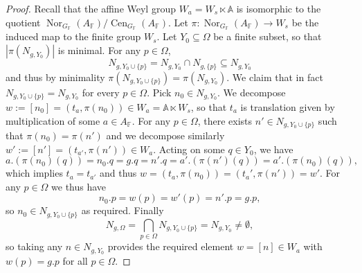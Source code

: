 \documentclass[10pt,a4paper]{amsart}
\newcommand{\A}{\mathbb{A}}
\newcommand{\F}{\mathbb{F} }
\begin{document}
\begin{proof}
			Recall that the affine Weyl group $W_a = W_s \ltimes \A$ is isomorphic to the quotient $\operatorname{Nor}_{G_\F}(A_\F) / \operatorname{Cen}_{G_\F}(A_\F)$. Let $\pi \colon \operatorname{Nor}_{G_\F}(A_\F) \to W_s$ be the induced map to the finite group $W_s$. Let $Y_0 \subseteq \Omega$ be a finite subset, so that $|\pi(N_{g,Y_0})|$ is minimal. For any $p \in \Omega$,
			$$
			N_{g,Y_0 \cup \{p\}} = N_{g,Y_0} \cap N_{g,\{p\}} \subseteq N_{g,Y_0}
			$$
			and thus by minimality $\pi(N_{g,Y_0 \cup \{p\}}) = \pi(N_{g,Y_0})$. We claim that in fact $N_{g,Y_0 \cup \{p\}} = N_{g,Y_0}$ for every $p \in \Omega$.
			Pick $n_0\in N_{g,Y_0}$. 
			We decompose $w := [n_0] =  (t_a,\pi(n_0)) \in W_a = \A \ltimes W_s$, so that $t_a$ is translation given by multiplication of some $a\in A_\F$. For any $p \in \Omega$, there exists $n' \in N_{g,Y_0 \cup \{p\}}$ such that $\pi(n_0) = \pi(n')$ and we decompose similarly $w' := [n'] = (t_{a'},\pi(n')) \in W_a$. Acting on some $q\in Y_0$, we have
			$$
			a.(\pi(n_0)(q)) = n_0.q = g.q = n'.q = a'.(\pi(n')(q)) = a'.(\pi(n_0)(q)),
			$$
			which implies $t_a = t_{a'}$ and thus $w= (t_a,\pi(n_0)) = (t_{a}', \pi(n')) = w'$. For any $p \in \Omega$ we thus have
			$$
			n_0.p = w(p) = w'(p) =  n'.p = g.p,
			$$
			so $n_0 \in N_{g, Y_0\cup\{p\}}$ as required. Finally
			$$
			N_{g,\Omega} %
			= \bigcap_{p \in \Omega} N_{g, Y_0\cup \{p\}} = N_{g,Y_0} \neq \emptyset,
			$$
			so taking any $n \in N_{g,Y_0}$ provides the required element $w = [n] \in W_a$ with $w(p) = g.p$ for all $p \in \Omega$.
		\end{proof}
\end{document}
